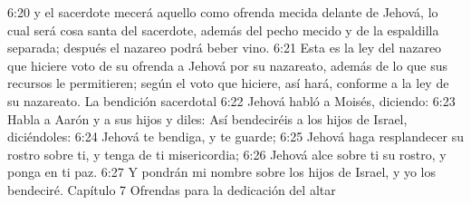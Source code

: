 6:20 y el sacerdote mecerá aquello como ofrenda mecida delante de Jehová, lo cual será cosa santa del sacerdote, además del pecho mecido y de la espaldilla separada; después el nazareo podrá beber vino.  
6:21 Esta es la ley del nazareo que hiciere voto de su ofrenda a Jehová por su nazareato, además de lo que sus recursos le permitieren; según el voto que hiciere, así hará, conforme a la ley de su nazareato.  
La bendición sacerdotal  
6:22 Jehová habló a Moisés, diciendo:  
6:23 Habla a Aarón y a sus hijos y diles: Así bendeciréis a los hijos de Israel, diciéndoles: 
6:24 Jehová te bendiga, y te guarde; 
6:25 Jehová haga resplandecer su rostro sobre ti, y tenga de ti misericordia; 
6:26 Jehová alce sobre ti su rostro, y ponga en ti paz. 
6:27 Y pondrán mi nombre sobre los hijos de Israel, y yo los bendeciré. 
Capítulo 7
Ofrendas para la dedicación del altar 

